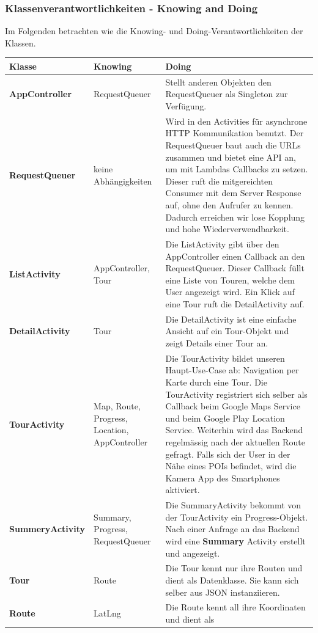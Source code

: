 \documentclass[a4paper,10pt,xetex]{article}
\begin{document}
\subsubsection{Klassenverantwortlichkeiten - Knowing and Doing}\label{knowinganddoing-frontend}
Im Folgenden betrachten wie die Knowing- und Doing-Verantwortlichkeiten der Klassen.
\begin{longtabu} to \textwidth { | l | X[2, l] | X[8, l] |  }
\hline
\textbf{Klasse} & \textbf{Knowing} & \textbf{Doing} \\\hline
\endhead
\textbf{AppController} & RequestQueuer & Stellt anderen Objekten den RequestQueuer
als Singleton zur Verfügung.\\\hline
\textbf{RequestQueuer} & keine Abhängigkeiten & Wird in den Activities für asynchrone
HTTP Kommunikation benutzt. Der RequestQueuer baut auch die URLs zusammen und bietet
eine API an, um mit Lambdas Callbacks zu setzen. Dieser ruft die mitgereichten
Consumer mit dem Server Response auf, ohne den Aufrufer zu kennen. Dadurch erreichen
wir lose Kopplung und hohe Wiederverwendbarkeit. \\\hline
\textbf{ListActivity} & AppController, Tour & Die ListActivity gibt über den AppController
einen Callback an den RequestQueuer. Dieser Callback füllt eine Liste von Touren,
welche dem User angezeigt wird. Ein Klick auf eine Tour ruft die DetailActivity auf.
\\\hline
\textbf{DetailActivity} & Tour & Die DetailActivity ist eine einfache Ansicht auf
ein Tour-Objekt und zeigt Details einer Tour an.\\\hline
\textbf{TourActivity} & Map, Route, Progress, Location, AppController & Die TourActivity bildet
unseren Haupt-Use-Case ab: Navigation per Karte durch eine Tour. Die TourActivity
registriert sich selber als Callback beim Google Maps Service und beim Google
Play Location Service. Weiterhin wird das Backend regelmässig nach der aktuellen
Route gefragt. Falls sich der User in der Nähe eines POIs befindet, wird die
Kamera App des Smartphones aktiviert.\\\hline
\textbf{SummeryActivity} & Summary, Progress, RequestQueuer & Die SummaryActivity
bekommt von der TourActivity ein Progress-Objekt. Nach einer Anfrage an das
Backend wird eine \textbf{Summary} Activity erstellt und angezeigt.\\\hline
\textbf{Tour} & Route & Die Tour kennt nur ihre Routen und dient als Datenklasse.
Sie kann sich selber aus JSON instanziieren.\\\hline
\textbf{Route} & LatLng & Die Route kennt all ihre Koordinaten und dient als

\end{longtabu}
\end{document}
